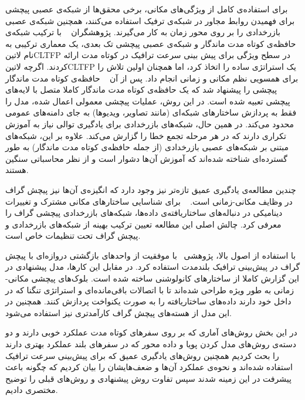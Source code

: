 برای استفاده‌ی کامل از ویژگی‌های مکانی، برخی محقق‌ها از شبکه‌ی عصبی پیچشی برای فهمیدن روابط مجاور در شبکه‌ی ترفیک استفاده می‌کنند،
همچنین شبکه‌ی عصبی بازرخدادی  را بر روی محور زمان به کار می‌گیرند.
پژوهشگران ~ با ترکیب شبکه‌ی حافظه‌ی کوتاه مدت ماندگار و شبکه‌ی عصبی پیچشی تک بعدی، یک معماری ترکیبی به نام ‌لاتین{CLTFP} در سطح ویژگی برای پیش بینی سرعت ترافیک در کوتاه مدت ارائه کردند. اگرچه ‌لاتین{CLTFP} یک استراتژی ساده را اتخاذ کرد، اما همچنان اولین تلاش را برای همسویی نظم مکانی و زمانی انجام داد.
پس از آن ~ حافظه‌ی کوتاه مدت ماندگار پیچشی را پیشنهاد شد که یک حافظه‌ی کوتاه مدت ماندگار کاملا متصل  با لایه‌های پیچشی تعبیه شده است. در این روش، عملیات پیچشی معمولی اعمال شده، مدل را فقط به پردازش ساختارهای شبکه‌ای (مانند تصاویر، ویدیوها) به جای دامنه‌های عمومی محدود می‌کند. در همین حال، شبکه‌های بازرخدادی برای یادگیری توالی نیاز به آموزش تکراری دارند که در هر مرحله تجمع خطا را گزارش می‌کند. علاوه بر این، شبکه‌های مبتنی بر شبکه‌های عصبی بازرخدادی (از جمله حافظه‌ی کوتاه مدت ماندگار) به طور گسترده‌ای شناخته شده‌اند که آموزش آن‌ها دشوار است و از نظر محاسباتی سنگین هستند.

چندین مطالعه‌ی یادگیری عمیق تازه‌تر نیز وجود دارد که انگیزه‌ی آن‌ها نیز پیچش گراف در وظایف مکانی-زمانی است. ~ برای شناسایی ساختارهای مکانی مشترک و تغییرات دینامیکی در دنباله‌های ساختاریافته‌ی داده‌ها،
شبکه‌های بازرخدادی پیچشی گراف  را معرفی کرد. چالش اصلی این مطالعه تعیین ترکیب بهینه از شبکه‌های بازرخدادی و پیچش گراف تحت تنظیمات خاص است.

با استفاده از اصول بالا، پژوهشی~ با موفقیت از واحدهای بازگشتی دروازه‌ای  با پیچش گراف در پیش‌بینی ترافیک بلندمدت استفاده کرد. در مقابل این کارها، مدل پیشنهادی در این گزارش کاملا از ساختارهای کانولوشنی ساخته شده است. بلوک‌های پیچشی مکانی-زمانی به طور ویژه طراحی شده‌اند تا با اتصالات باقی‌مانده‌ای و استراتژی تنگنا که در داخل خود دارند داده‌های ساختاریافته را به صورت یکنواخت پردازش کنند. همچنین در این مدل از هسته‌های پیچش گراف کارآمدتری نیز استفاده می‌شود.

در این بخش روش‌های آماری که بر روی سفرهای کوتاه مدت عملکرد خوبی دارند و دو دسته‌ی روش‌های مدل کردن پویا و داده محور که در سفرهای بلند عملکرد بهتری دارند را بحث کردیم همچنین روش‌های یادگیری عمیق که برای پیش‌بینی سرعت ترافیک استفاده شده‌اند و نحوه‌ی عملکرد آن‌ها و ضعف‌هایشان را بیان کردیم که چگونه باعث پیشرفت در این زمینه شدند سپس تفاوت روش پیشنهادی و روش‌های قبلی را توضیح مختصری دادیم.
